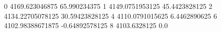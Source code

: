 0 4169.623046875 65.990234375
1 4149.0751953125 45.4423828125
2 4134.22705078125 30.59423828125
4 4110.0791015625 6.4462890625
6 4102.98388671875 -0.64892578125
8 4103.6328125 0.0
